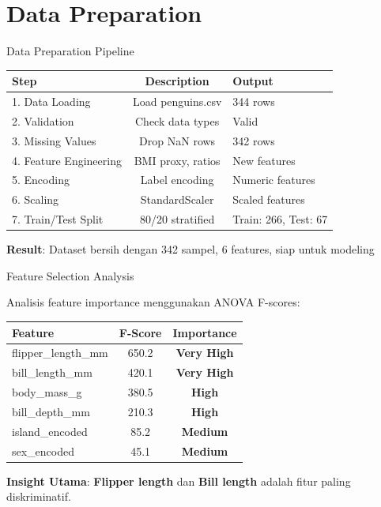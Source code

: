 \documentclass[aspectratio=169]{beamer}
\newcommand{\hl}[1]{\textcolor{AWSOrange}{\textbf{#1}}}
\newcommand{\hlb}[1]{\textcolor{AWSBlue}{\textbf{#1}}}
\newcommand{\hlg}[1]{\textcolor{AWSGreen}{\textbf{#1}}}
\newcommand{\hly}[1]{\textcolor{AWSYellow}{\textbf{#1}}}
\begin{document}
\section{Data Preparation}

\begin{frame}{Data Preparation Pipeline}
\fontsize{10}{11}\selectfont

\begin{center}
\begin{tabular}{lcl}
\toprule
Step & Description & Output \\
\midrule
1. Data Loading & Load penguins.csv & 344 rows \\
2. Validation & Check data types & Valid \\
3. Missing Values & Drop NaN rows & 342 rows \\
4. Feature Engineering & BMI proxy, ratios & New features \\
5. Encoding & Label encoding & Numeric features \\
6. Scaling & StandardScaler & Scaled features \\
7. Train/Test Split & 80/20 stratified & Train: 266, Test: 67 \\
\bottomrule
\end{tabular}
\end{center}

\vspace{0.2in}
\hlg{Result}: Dataset bersih dengan 342 sampel, 6 features, siap untuk modeling
\end{frame}

\begin{frame}{Feature Selection Analysis}
\fontsize{10}{11}\selectfont

Analisis feature importance menggunakan ANOVA F-scores:

\begin{table}[htbp]
\centering
\begin{tabular}{lcc}
\toprule
Feature & F-Score & Importance \\
\midrule
flipper\_length\_mm & 650.2 & \hlg{Very High} \\
bill\_length\_mm & 420.1 & \hlg{Very High} \\
body\_mass\_g & 380.5 & \hlb{High} \\
bill\_depth\_mm & 210.3 & \hlb{High} \\
island\_encoded & 85.2 & \hly{Medium} \\
sex\_encoded & 45.1 & \hly{Medium} \\
\bottomrule
\end{tabular}
\end{table}

\vspace{0.2in}
\textbf{Insight Utama}: \hl{Flipper length} dan \hl{Bill length} adalah fitur paling diskriminatif.
\end{frame}
\end{document}
